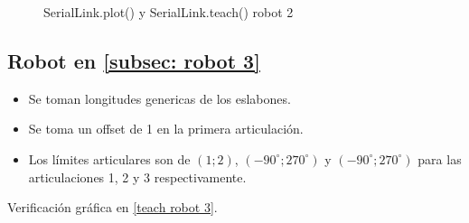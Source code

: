 \documentclass[a4paper,12pt]{article}
\begin{document}
\begin{figure}[H]
    \centering
    \begin{adjustbox}{max width=\columnwidth}
    \end{adjustbox}
    \caption{SerialLink.plot() y SerialLink.teach() robot 2}
    \label{teach robot 2}
\end{figure}

\subsection{Robot en \cref{subsec: robot 3}}
\begin{itemize}
    \item Se toman longitudes genericas de los eslabones.
    \item Se toma un offset de 1 en la primera articulación.
    \item Los límites articulares son de $\left(1; 2\right)$, $\left(-90^\circ; 270^\circ\right)$ y $\left(-90^\circ; 270^\circ\right)$ para las articulaciones 1, 2 y 3 respectivamente.
\end{itemize}

Verificación gráfica en \cref{teach robot 3}.
\end{document}
